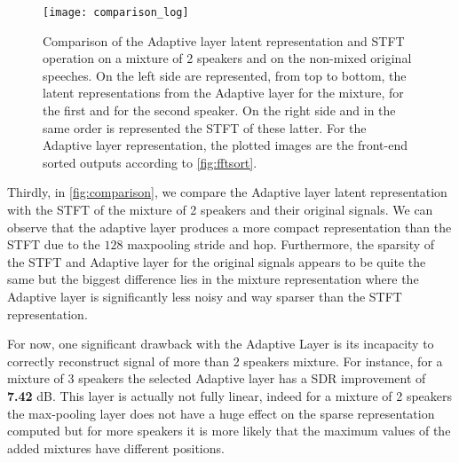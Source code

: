 \documentclass[master, tikz, final,11pt, dvipdfmx]{iscs-thesis}
\begin{document}
\begin{figure}[h!]
\centering
\texttt{[image: comparison\_log]}
\caption[Comparison of the Adaptive layer latent representation and STFT operation on a mixture of 2 speakers and on the non-mixed original speeches]{Comparison of the Adaptive layer latent representation and STFT operation on a mixture of 2 speakers and on the non-mixed original speeches. On the left side are represented, from top to  bottom, the latent representations from the Adaptive layer for the mixture, for the first and for the second speaker. On the right side and in the same order is represented the STFT of these latter. For the Adaptive layer representation, the plotted images are the front-end sorted outputs according to \autoref{fig:fftsort}.}
\label{fig:comparison} 
\end{figure}

Thirdly, in \autoref{fig:comparison}, we compare the Adaptive layer latent representation with the STFT of the mixture of 2 speakers and their original signals. We can observe that the adaptive layer produces a more compact representation than the STFT due to the $128$ maxpooling stride and hop. Furthermore, the sparsity of the STFT and Adaptive layer for the original signals appears to be quite the same but the biggest difference lies in the mixture representation where the Adaptive layer is significantly less noisy and way sparser than the STFT representation.


For now, one significant drawback with the Adaptive Layer is its incapacity to correctly reconstruct signal of more than 2 speakers mixture. For instance, for a mixture of 3 speakers the selected Adaptive layer has a SDR improvement of \textbf{7.42} dB. This layer is actually not fully linear, indeed for a mixture of 2 speakers the max-pooling layer does not have a huge effect on the sparse representation computed but for more speakers it is more likely that the maximum values of the added mixtures have different positions.
\end{document}
